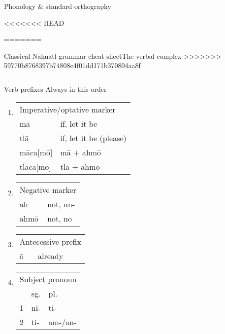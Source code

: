 \documentclass[12pt]{beamer}
\newcommand{\nah}[1]{\textcolor{nahgrn}{#1}}
\newcommand{\trs}[1]{\textcolor{nahblu}{#1}}
\begin{document}
\begin{frame}
\begin{columns}[t]
\begin{column}{.22\linewidth}
\begin{block}{Phonology \& standard orthography}
\begin{threeparttable}
\begin{tablenotes}
<<<<<<< HEAD
\begin{frame}%
=======
\begin{frame}%
  {Classical Nahuatl grammar cheat sheet}{The verbal complex}
>>>>>>> 59770b8768397b74808c4f01dd171b370804aa8f
  \begin{columns}[t]
    \begin{column}{0.18\linewidth}
      \begin{block}{Verb prefixes}
        Always in this order
        \begin{enumerate}
<<<<<<< HEAD
        \item
          \begin{tabular}[t]{ll}
            \multicolumn{2}{l}{Imperative/optative marker}       \\
            \nah{mā} & \trs{if, let it be} \\
            \nah{tlā} & \trs{if, let it be (please)}\\
            \nah{māca[mō]} & \nah{mā + ahmō} \\
            \nah{tlāca[mō]} & \nah{tlā + ahmō} \\
          \end{tabular}
        \item
          \begin{tabular}[t]{ll}
            \multicolumn{2}{l}{Negative marker}\\
            \nah{ah} & \trs{not, un-}\\
            \nah{ahmō} & \trs{not, no} \\
          \end{tabular}
        \item 
          \begin{tabular}[t]{ll}
            \multicolumn{2}{l}{Antecessive prefix}\\
            \nah{ō} & \trs{already} \\
          \end{tabular}
        \item 
          \begin{threeparttable}
            \begin{tabular}[t]{lll}
              \multicolumn{3}{l}{Subject pronoun}\\
              & sg. & pl. \\
              1 & \nah{ni-} & \nah{ti-}\\
              2 & \nah{ti-}\tnote{1} & \nah{am-/an-}\tnote{1} \\

\end{tabular}
\end{threeparttable}
\end{enumerate}
\end{block}
\end{column}
\end{columns}
\end{frame}
\end{frame}
\end{tablenotes}
\end{threeparttable}
\end{block}
\end{column}
\end{columns}
\end{frame}
\end{document}
